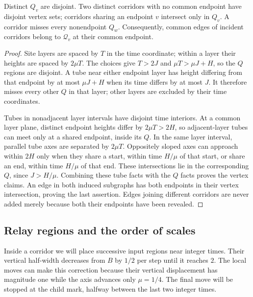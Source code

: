 \begin{lemma}\label{lem:corridors}
Distinct $Q_v$ are disjoint. Two distinct corridors with no common
endpoint have disjoint vertex sets; corridors sharing an endpoint $v$
intersect only in $Q_v$. A corridor misses every nonendpoint $Q_w$.
Consequently, common edges of incident corridors belong to
$\mathcal Q_v$ at their common endpoint.
\end{lemma}

\begin{proof}
Site layers are spaced by $T$ in the time coordinate; within a layer
their heights are spaced by $2\mu T$. The choices give
$T>2J$ and $\mu T>\mu J+H$, so the $Q$ regions are disjoint.
A tube near either endpoint layer has height differing from that
endpoint by at most $\mu J+H$ when its time differs by at most $J$.
It therefore misses every other $Q$ in that layer; other layers are
excluded by their time coordinates.

Tubes in nonadjacent layer intervals have disjoint time interiors.
At a common layer plane, distinct endpoint heights differ by
$2\mu T>2H$, so adjacent-layer tubes can meet only at a shared
endpoint, inside its $Q$. In the same layer interval, parallel tube
axes are separated by $2\mu T$. Oppositely sloped axes can approach
within $2H$ only when they share a start, within time $H/\mu$ of
that start, or share an end, within time $H/\mu$ of that end.
These intersections lie in the corresponding $Q$, since $J>H/\mu$.
Combining these tube facts with the $Q$ facts proves the vertex claims.
An edge in both induced subgraphs has both endpoints in their vertex
intersection, proving the last assertion. Edges joining different
corridors are never added merely because both their endpoints have
been revealed.
\end{proof}

\subsection{Relay regions and the order of scales}
\label{subsec:corridor-scales}

Inside a corridor we will place successive input regions near integer
times. Their vertical half-width decreases from $B$ by $1/2$ per step
until it reaches $2$. The local moves can make this correction because
their vertical displacement has magnitude one while the axis advances
only $\mu=1/4$. The final move will be stopped at the child mark,
halfway between the last two integer times.

